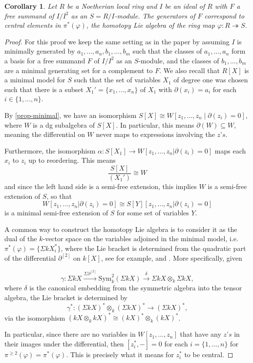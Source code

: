\documentclass{amsart}
\newtheorem{corollary}[theorem]{Corollary}
\theoremstyle{definition}
\theoremstyle{remark}
\begin{document}
\begin{corollary}
\label{centralrecovery}
    Let $R$ be a Noetherian local ring and $I$ be an ideal of $R$ with $F$ a free summand of $I/I^2$ as an $S= R/I$-module. The generators of $F$ correspond to central elements in  $\pi^{*}(\varphi)$, the homotopy Lie algebra of the ring map $\varphi: R \twoheadrightarrow S$.
\end{corollary}



\begin{proof}
    For this proof we keep the same setting as in the paper by assuming $I$ is minimally generated by $a_1,\ldots, a_n, b_1, \ldots, b_m$ such that the classes of $a_1,\ldots, a_n$ form a basis for a free summand $F$ of $I/I^2$ as an $S$-module, and the classes of $b_1, \ldots, b_m$ are a minimal generating set for a complement to $F$. We also recall that $R[X]$ is a minimal model for $S$ such that the set of variables $X_1$ of degree one was chosen such that there is a subset $X_1'= \{x_1, \ldots, x_n\}$ of $X_1$ with $\partial(x_i) =a_i$ for each $i \in \{1, \ldots, n\}$.

    By \cref{prop-minimal}, we have an isomorphism $S[X] \cong W[ z_1,\ldots, z_n \mid \partial(z_i)=0]$, where $W$ is a dg subalgebra of $S[X]$. In particular, this means $\partial(W) \subseteq W$, meaning the differential on $W$ never maps to expressions involving the $z\text{'}s$.

Furthermore, the isomorphism $\alpha: S[X_1] \to W[z_1, \ldots, z_n | \partial(z_i)=0]$ maps each $x_i$ to $z_i$ up to reordering. This means 
\[ \frac{S[X]}{(X_1')} \cong W\]
and since the left hand side is a semi-free extension, this implies $W$ is a semi-free extension of $S$, so that
\[
W[z_1, \ldots, z_n | \partial(z_i)=0] \cong S[Y][z_1,\ldots, z_n| \partial(z_i)=0]
\]
is a minimal semi-free extension of $S$ for some set of variables $Y$.

A common way to construct the homotopy Lie algebra is to consider it as the dual of the $k$-vector space on the variables adjoined in the minimal model, i.e. $\pi^{*}(\varphi) = \{\Sigma k X_i^*\}$, where the Lie bracket is determined from the quadratic part of the differential $\partial^{[2]}$ on $k[X]$, see for example, \cite[appendix B]{Quillen} and \cite[Theorem 4.2]{Avramov84}. More specifically, given

\[
\gamma: \Sigma kX \xrightarrow{\Sigma\partial^{[2]}} \text{Sym}_k^2 (\Sigma kX) \xrightarrow{\delta} \Sigma kX \otimes_k \Sigma kX,
\]
 where $\delta$ is the canonical embedding from the symmetric algebra into the tensor algebra, the Lie bracket is determined by \[\gamma^{*}: (\Sigma kX)^* \otimes _k (\Sigma kX)^* \to  (\Sigma kX)^*,\]
 via the isomorphism $(kX \otimes_k kX)^* \cong (kX)^* \otimes_k (kX)^*$.

 In particular, since there are no variables in $W[z_1, \ldots, z_n]$ that have any $z\text{'}s$ in their images under the differential, then $[z_i^*, - ]=0$ for each $i = \{1, \ldots, n\}$ for $\pi^{\geq2}(\varphi) = \pi^*(\varphi)$. This is precisely what it means for $z_i^*$ to be central.
\end{proof}
\end{document}
